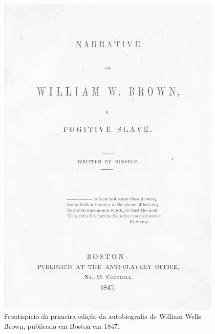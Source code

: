 \pagebreak

\begin{absolutelynopagebreak}
\begin{vplace}
\begin{figure}[H]
\begin{adjustwidth}{-1.8cm}{}
  \vspace*{-2.6cm}
  \includegraphics[width=133mm]{./imgs/front2.jpg}  
\end{adjustwidth}
  \caption{Frontispício da primeira edição da autobiografia de William Wells Brown, publicada em Boston em 1847.}
\end{figure}
\end{vplace}

\thispagestyle{empty}
\end{absolutelynopagebreak}


